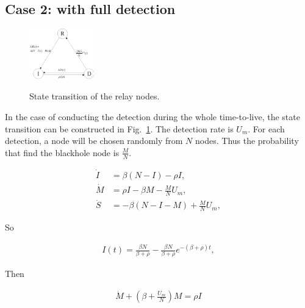 \subsection{Case 2: with full detection}
\label{subsec:full_detc}
\begin{figure}
  \centering
  {\includegraphics[width=0.25\textwidth]
  {fig/state_transition_detect.eps}}
     \caption{State transition of the relay nodes.}
     \label{fig:ss_dt}
\end{figure}
In the case of conducting the detection during the whole time-to-live,
the state transition can be constructed in Fig.~\ref{fig:ss_dt}.
The detection rate is $U_{m}$.
For each detection, a node will be chosen randomly from $N$ nodes.
Thus the probability that find the blackhole node is $\frac{M}{N}$.
\begin{small}
\begin{equation}
\nonumber
\begin{aligned}
\dot{I} &= \beta (N-I) - \rho I,\\
\dot{M} &= \rho I - \beta M - \frac{M}{N} U_{m},\\
\dot{S} &= - \beta (N-I-M) + \frac{M}{N} U_{m},
\end{aligned}
\end{equation}
\end{small}
So
\begin{small}
\begin{equation}
\nonumber
\begin{aligned}
I(t) = \frac{ \beta N }{ \beta + \rho } - \frac{ \beta N }{ \beta + \rho } e^{-(\beta + \rho)t},
\end{aligned}
\end{equation}
\end{small}
Then
\begin{small}
\begin{equation}
\nonumber
\begin{aligned}
\dot{M} + (\beta + \frac{U_{m}}{N})M = \rho I
\end{aligned}
\end{equation}
\end{small}

